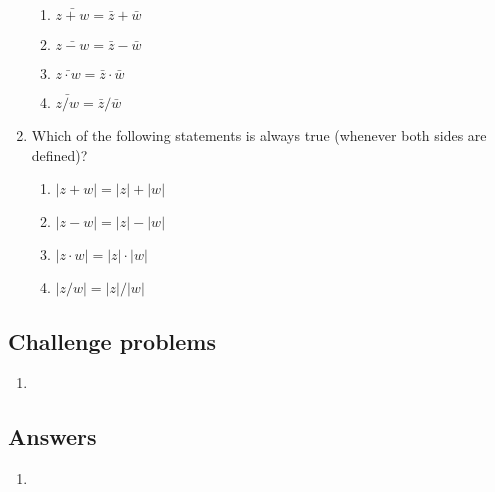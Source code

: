 \begin{enumerate}
\begin{enumerate}[label=(\Roman*)]
\item $\bar{z + w} = \bar{z} + \bar{w}$
\item $\bar{z - w} = \bar{z} - \bar{w}$
\item $\bar{z\cdot w} = \bar{z}\cdot\bar{w}$
\item $\bar{z/w} = \bar{z}/\bar{w}$
\end{enumerate}
\item Which of the following statements is always true (whenever both sides are defined)?
\begin{enumerate}[label=(\Roman*)]
\item $\lvert z + w\rvert = \lvert z\rvert + \lvert w\rvert$
\item $\lvert z - w\rvert = \lvert z\rvert - \lvert w\rvert$
\item $\lvert z\cdot w\rvert = \lvert z\rvert\cdot\lvert w\rvert$
\item $\lvert z/w\rvert = \lvert z\rvert / \lvert w\rvert$
\end{enumerate}
\end{enumerate}


\subsection{Challenge problems}

\begin{enumerate}[resume]
\item 
\end{enumerate} %


\subsection{Answers}

\begin{enumerate}
\item 
\end{enumerate}